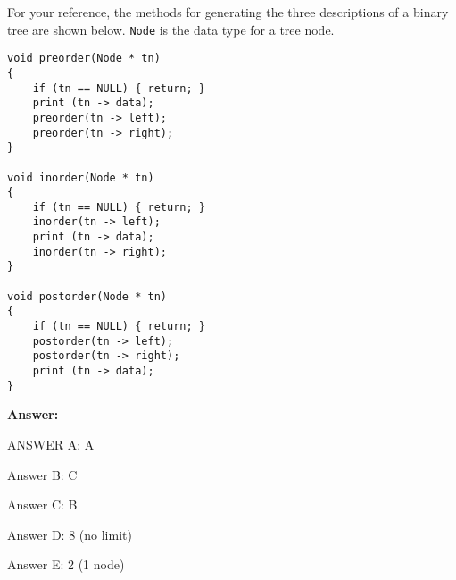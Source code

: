 For your reference, the methods for generating the three descriptions
of a binary tree are shown below.  {\tt Node} is the data type for a
tree node.

\begin{verbatim}
void preorder(Node * tn)
{
    if (tn == NULL) { return; }
    print (tn -> data);
    preorder(tn -> left);
    preorder(tn -> right);
}

void inorder(Node * tn)
{
    if (tn == NULL) { return; }
    inorder(tn -> left);
    print (tn -> data);
    inorder(tn -> right);
}

void postorder(Node * tn)
{
    if (tn == NULL) { return; }
    postorder(tn -> left);
    postorder(tn -> right);
    print (tn -> data);
}
\end{verbatim}


\ifexam


\else


{\bf Answer:}

ANSWER A: A

Answer B: C

Answer C: B

Answer D: 8 (no limit)

Answer E: 2 (1 node)


\fi
